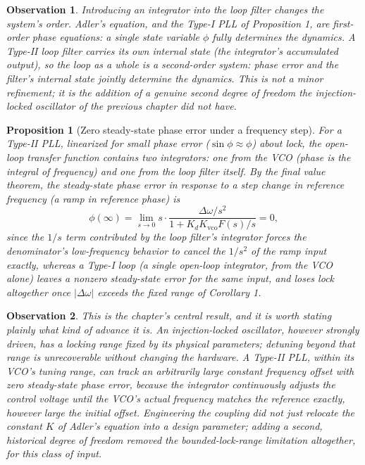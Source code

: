 \documentclass[12pt]{article}
\newtheorem{proposition}{Proposition}
\newtheorem{observation}{Observation}
\begin{document}
\begin{observation}
Introducing an integrator into the loop filter changes the system's order. Adler's equation, and the Type-I PLL of Proposition 1, are first-order phase equations: a single state variable $\phi$ fully determines the dynamics. A Type-II loop filter carries its own internal state (the integrator's accumulated output), so the loop as a whole is a second-order system: phase error and the filter's internal state jointly determine the dynamics. This is not a minor refinement; it is the addition of a genuine second degree of freedom the injection-locked oscillator of the previous chapter did not have.
\end{observation}

\begin{proposition}[Zero steady-state phase error under a frequency step]
For a Type-II PLL, linearized for small phase error ($\sin\phi \approx \phi$) about lock, the open-loop transfer function contains two integrators: one from the VCO (phase is the integral of frequency) and one from the loop filter itself. By the final value theorem, the steady-state phase error in response to a step change in reference frequency (a ramp in reference phase) is
\[
\phi(\infty) = \lim_{s \to 0} s \cdot \frac{\Delta\omega/s^2}{1 + K_d K_{\text{vco}} F(s)/s} = 0,
\]
since the $1/s$ term contributed by the loop filter's integrator forces the denominator's low-frequency behavior to cancel the $1/s^2$ of the ramp input exactly, whereas a Type-I loop (a single open-loop integrator, from the VCO alone) leaves a nonzero steady-state error for the same input, and loses lock altogether once $|\Delta\omega|$ exceeds the fixed range of Corollary 1.
\end{proposition}

\begin{observation}
This is the chapter's central result, and it is worth stating plainly what kind of advance it is. An injection-locked oscillator, however strongly driven, has a locking range fixed by its physical parameters; detuning beyond that range is unrecoverable without changing the hardware. A Type-II PLL, within its VCO's tuning range, can track an arbitrarily large constant frequency offset with zero steady-state phase error, because the integrator continuously adjusts the control voltage until the VCO's actual frequency matches the reference exactly, however large the initial offset. Engineering the coupling did not just relocate the constant $K$ of Adler's equation into a design parameter; adding a second, historical degree of freedom removed the bounded-lock-range limitation altogether, for this class of input.
\end{observation}
\end{document}

